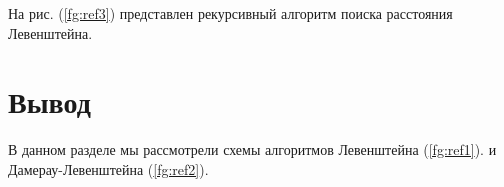 \begin{figure}[ht!]
\end{figure}


На рис. (\ref{fg:ref3}) представлен рекурсивный алгоритм поиска расстояния Левенштейна.

\begin{figure}[ht!]
\end{figure}

\section{Вывод}

В данном разделе мы рассмотрели схемы алгоритмов Левенштейна (\ref{fg:ref1}). и Дамерау-Левенштейна (\ref{fg:ref2}).







